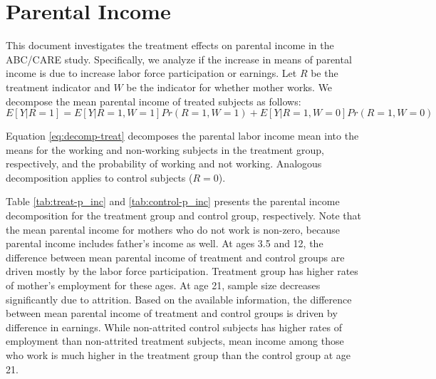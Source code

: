 \documentclass[12pt]{article}
\begin{document}
\section{Parental Income}

This document investigates the treatment effects on parental income in the ABC/CARE study. Specifically, we analyze if the increase in means of parental income is due to increase labor force participation or earnings. Let $R$ be the treatment indicator and $W$ be the indicator for whether mother works. We decompose the mean parental income of treated subjects as follows:
\begin{equation} \label{eq:decomp-treat}
E[Y|R=1] = E[Y|R=1,W=1]Pr(R=1,W=1) + E[Y|R=1,W=0]Pr(R=1,W=0)
\end{equation}

\noindent Equation \ref{eq:decomp-treat} decomposes the parental labor income mean into the means for the working and non-working subjects in the treatment group, respectively, and the probability of working and not working. Analogous decomposition applies to control subjects ($R=0$). 

Table \ref{tab:treat-p_inc} and \ref{tab:control-p_inc} presents the parental income decomposition for the treatment group and control group, respectively. Note that the mean parental income for mothers who do not work is non-zero, because parental income includes father's income as well. At ages 3.5 and 12, the difference between mean parental income of treatment and control groups are driven mostly by the labor force participation. Treatment group has higher rates of mother's employment for these ages. At age 21, sample size decreases significantly due to attrition. Based on the available information, the difference between mean parental income of treatment and control groups is driven by difference in earnings. While non-attrited control subjects has higher rates of employment than non-attrited treatment subjects, mean income among those who work is much higher in the treatment group than the control group at age 21.
\end{document}
